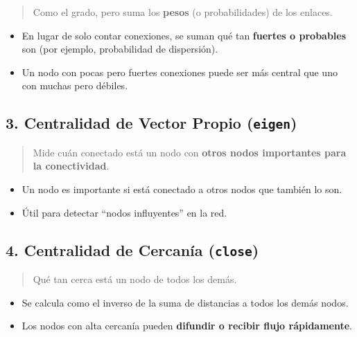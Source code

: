\documentclass[
]{book}
\providecommand{\tightlist}{%
  \setlength{\itemsep}{0pt}\setlength{\parskip}{0pt}}
\begin{document}
\begin{quote}
Como el grado, pero suma los \textbf{pesos} (o probabilidades) de los enlaces.
\end{quote}

\begin{itemize}
\tightlist
\item
  En lugar de solo contar conexiones, se suman qué tan \textbf{fuertes o probables} son (por ejemplo, probabilidad de dispersión).
\item
  Un nodo con pocas pero fuertes conexiones puede ser más central que uno con muchas pero débiles.
\end{itemize}

\subsection{\texorpdfstring{3. Centralidad de Vector Propio (\texttt{eigen})}{3. Centralidad de Vector Propio (eigen)}}\label{centralidad-de-vector-propio-eigen}

\begin{quote}
Mide cuán conectado está un nodo con \textbf{otros nodos importantes para la conectividad}.
\end{quote}

\begin{itemize}
\tightlist
\item
  Un nodo es importante si está conectado a otros nodos que también lo son.
\item
  Útil para detectar ``nodos influyentes'' en la red.
\end{itemize}

\subsection{\texorpdfstring{4. Centralidad de Cercanía (\texttt{close})}{4. Centralidad de Cercanía (close)}}\label{centralidad-de-cercanuxeda-close}

\begin{quote}
Qué tan cerca está un nodo de todos los demás.
\end{quote}

\begin{itemize}
\tightlist
\item
  Se calcula como el inverso de la suma de distancias a todos los demás nodos.
\item
  Los nodos con alta cercanía pueden \textbf{difundir o recibir flujo rápidamente}.
\end{itemize}
\end{document}
